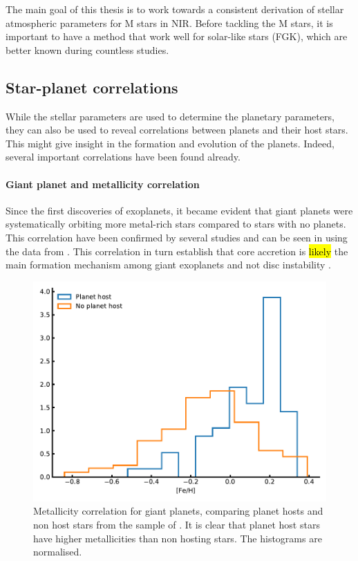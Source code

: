 The main goal of this thesis is to work towards a consistent derivation of stellar atmospheric
parameters for M stars in NIR. Before tackling the M stars, it is important to have a method that
work well for solar-like stars (FGK), which are better known during countless studies.

\subsection{Star-planet correlations}

While the stellar parameters are used to determine the planetary parameters, they can also be used
to reveal correlations between planets and their host stars. This might give insight in the
formation and evolution of the planets. Indeed, several important correlations have been found
already.

\paragraph{Giant planet and metallicity correlation}

Since the first discoveries of exoplanets, it became evident that giant planets were systematically
orbiting more metal-rich stars compared to stars with no planets. This correlation have been
confirmed by several studies \citep{Gonzalez1997,Santos2004,Fischer2005,Sousa2008a,Mortier2013b} and
can be seen in  using the data from \citet{Sousa2008a}. This correlation in
turn establish that core accretion is \hl{likely} the main formation mechanism among giant exoplanets
\citep{Pollack1996,Ida2004,Mordasini2012} and not disc instability \citep{Boss2002}.

\begin{figure}[htpb!]
    \centering
    \includegraphics[width=1.0\linewidth]{figures/fehCorrelation.pdf}
    \caption{Metallicity correlation for giant planets, comparing planet hosts and non host stars
             from the sample of \citet{Sousa2008a}. It is clear that planet host stars have higher
             metallicities than non hosting stars. The histograms are normalised.}
    \label{fig:fehCorrelation}
\end{figure}


